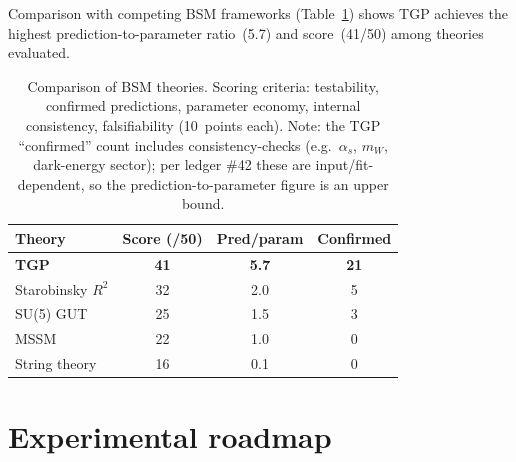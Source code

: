 \documentclass[aps,prl,twocolumn,superscriptaddress,showpacs,floatfix]{revtex4-2}
\newcommand{\as}{\alpha_s}
\begin{document}
Comparison with competing BSM frameworks (Table~\ref{tab:comparison})
shows TGP achieves the highest prediction-to-parameter ratio~(5.7)
and score~(41/50) among theories evaluated.

\begin{table}[b]
\caption{Comparison of BSM theories.
  Scoring criteria: testability, confirmed predictions, parameter
  economy, internal consistency, falsifiability (10~points each).
  Note: the TGP ``confirmed'' count includes consistency-checks
  (e.g.\ $\as$, $m_W$, dark-energy sector); per ledger \#42 these are
  input/fit-dependent, so the prediction-to-parameter figure is an
  upper bound.}
\label{tab:comparison}
\begin{ruledtabular}
\begin{tabular}{lccc}
Theory & Score (/50) & Pred/param & Confirmed \\
\hline
\textbf{TGP}       & \textbf{41} & \textbf{5.7} & \textbf{21} \\
Starobinsky $R^2$   & 32 & 2.0 & 5 \\
SU(5) GUT          & 25 & 1.5 & 3 \\
MSSM               & 22 & 1.0 & 0 \\
String theory       & 16 & 0.1 & 0 \\
\end{tabular}
\end{ruledtabular}
\end{table}


\section{Experimental roadmap}
\end{document}

